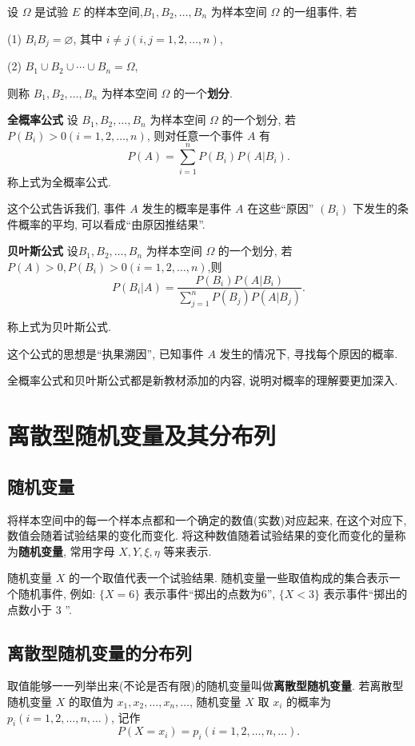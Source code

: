 \documentclass[titlepage]{ctexart}
\begin{document}
设 $\varOmega$ 是试验 $E$ 的样本空间,$B_{1},B_{2},\dots,B_{n}$ 为样本空间 $\varOmega$ 的一组事件, 若

(1) $B_{i}B_{j} = \varnothing$, 其中 $i \neq j (i,j=1,2,\dots,n)$,

(2) $B_{1}\cup B_{2}\cup \cdots \cup B_{n} = \varOmega$,

则称 $B_{1},B_{2},\dots,B_{n}$ 为样本空间 $\varOmega$ 的一个\textbf{划分}.

\textbf{全概率公式} \quad 设 $B_{1},B_{2},\dots,B_{n}$ 为样本空间 $\varOmega$ 的一个划分, 若 $P(B_{i}) > 0(i=1,2,\dots,n)$, 则对任意一个事件 $A$ 有
\[
P(A) = \sum_{i=1}^n P(B_{i})P(A|B_{i}).
\]
称上式为全概率公式.

这个公式告诉我们, 事件 $A$ 发生的概率是事件 $A$ 在这些``原因'' $(B_{i})$ 下发生的条件概率的平均, 可以看成``由原因推结果''.

\textbf{贝叶斯公式} \quad 设$B_{1},B_{2},\dots,B_{n}$ 为样本空间 $\varOmega$ 的一个划分, 若 $P(A)>0,P(B_{i})>0(i=1,2,\dots,n)$,则
\[
P(B_{i}|A) = \frac{P(B_{i})P(A|B_{i})}{\sum\limits_{j=1}^{n}P(B_{j})P(A|B_{j})}.
\]

称上式为贝叶斯公式. 

这个公式的思想是``执果溯因'', 已知事件 $A$ 发生的情况下, 寻找每个原因的概率.

全概率公式和贝叶斯公式都是新教材添加的内容, 说明对概率的理解要更加深入.


\section{离散型随机变量及其分布列}

\subsection{随机变量}

将样本空间中的每一个样本点都和一个确定的数值(实数)对应起来, 在这个对应下, 数值会随着试验结果的变化而变化. 
将这种数值随着试验结果的变化而变化的量称为\textbf{随机变量}, 常用字母 $X, Y, \xi, \eta$ 等来表示.  

随机变量 $X$ 的一个取值代表一个试验结果. 随机变量一些取值构成的集合表示一个随机事件, 例如: $\{X = 6\}$ 表示事件``掷出的点数为6'', $\{X < 3\}$ 表示事件``掷出的点数小于 3 ''.

\subsection{离散型随机变量的分布列}

取值能够一一列举出来(不论是否有限)的随机变量叫做\textbf{离散型随机变量}.
若离散型随机变量 $X$ 的取值为 $x_{1},x_{2},\dots,x_{n},\dots$, 随机变量 $X$ 取 $x_{i}$ 的概率为 $p_{i}(i=1,2,\dots,n,\dots)$, 记作
\begin{equation}
P(X=x_{i}) = p_{i}(i=1,2,\dots,n,\dots).\label{equ:e1}
\end{equation}
\end{document}
